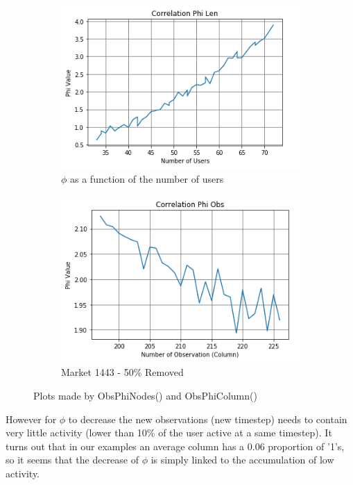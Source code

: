 \documentclass{report}
\begin{document}
\begin{figure}[ht] 
  \begin{subfigure}[b]{0.5\linewidth}
    \centering
    \includegraphics[width=0.75\linewidth]{./Graphs/PhiNodes-Market-1410-0.6-Removed} 
    \caption{$\phi $ as a function of the number of users }
    \label{fig2:a} 
    \vspace{4ex}
  \end{subfigure}%
  \begin{subfigure}[b]{0.5\linewidth}
    \centering
    \includegraphics[width=0.75\linewidth]{./Graphs/PhiColumn-Market-1428-0.6-Removed} 
    \caption{Market 1443 - 50\% Removed} 
    \label{fig2:b} 
    \vspace{4ex}
  \end{subfigure} 
	\label{fig2}
	\caption{Plots made by ObsPhiNodes() and ObsPhiColumn()}
\end{figure}

However for $\phi $ to decrease the new observations (new timestep) needs to contain very little activity (lower than 10\% of the user active at a same timestep). It turns out that in our examples an average column has a 0.06 proportion of '1's, so it seems that the decrease of $\phi $ is simply linked to the accumulation of low activity. 
\end{document}

